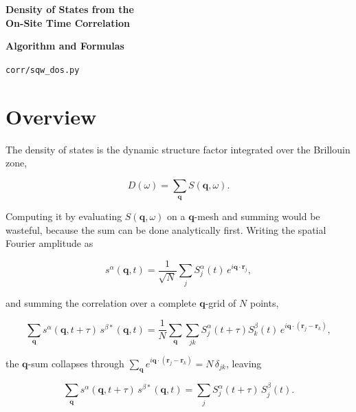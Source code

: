 \documentclass[12pt, a4paper, oneside]{article}
\newcommand{\qvec}{\mathbf{q}}
\newcommand{\rvec}{\mathbf{r}}
\newcommand{\Na}{N}
\newcommand{\field}{S}
\begin{document}
\thispagestyle{empty}
\vspace*{\fill}
\begin{center}
    \Huge\textbf{Density of States from the\\On-Site Time Correlation}

    \vspace{1cm}
    \Large\textbf{Algorithm and Formulas}

    \vspace{0.8cm}
    \large \texttt{corr/sqw\_dos.py}
\end{center}
\vspace*{\fill}

\newpage
\tableofcontents
\newpage

\section{Overview}

The density of states is the dynamic structure factor integrated over the
Brillouin zone,

\begin{equation}
    D(\omega) = \sum_{\qvec} S(\qvec,\omega).
\end{equation}

Computing it by evaluating $S(\qvec,\omega)$ on a $\qvec$-mesh and summing
would be wasteful, because the sum can be done analytically first. Writing the
spatial Fourier amplitude as

\begin{equation}
    s^\alpha(\qvec,t) = \frac{1}{\sqrt{\Na}}\sum_j \field_j^\alpha(t)\,
                        e^{i\qvec\cdot\rvec_j},
\end{equation}

and summing the correlation over a complete $\qvec$-grid of $\Na$ points,

\begin{equation}
    \sum_{\qvec} s^\alpha(\qvec,t{+}\tau)\,s^{\beta*}(\qvec,t)
    = \frac{1}{\Na}\sum_{\qvec}\sum_{jk}
        \field_j^\alpha(t{+}\tau)\field_k^\beta(t)\,e^{i\qvec\cdot(\rvec_j-\rvec_k)} ,
\end{equation}

the $\qvec$-sum collapses through
$\sum_{\qvec}e^{i\qvec\cdot(\rvec_j-\rvec_k)} = \Na\,\delta_{jk}$, leaving

\begin{equation}
\boxed{
    \sum_{\qvec} s^\alpha(\qvec,t{+}\tau)\,s^{\beta*}(\qvec,t)
    = \sum_j \field_j^\alpha(t{+}\tau)\,\field_j^\beta(t).
}
\label{eq:parseval}
\end{equation}
\end{document}
